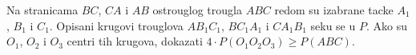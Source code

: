 \problem
Na stranicama $BC$, $CA$ i $AB$ ostrouglog trougla $ABC$ redom su izabrane tacke $A_1$, $B_1$ i $C_1$.
Opisani krugovi trouglova $A B_1 C_1$, $B C_1 A_1$ i $C A_1 B_1$ seku se u $P$.
Ako su $O_1$, $O_2$ i $O_3$ centri tih krugova, dokazati $4 \cdot P(O_1 O_2 O_3) \geq P(ABC)$.
\solution
\endproblem
